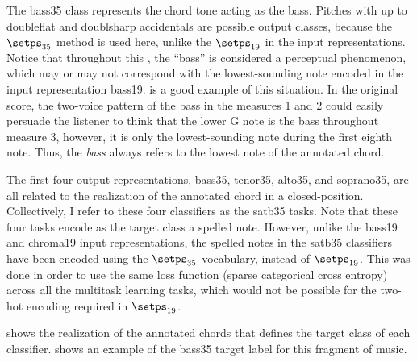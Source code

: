 
The \gls{bass35} class represents the chord tone acting as
the bass. Pitches with up to \gls{doubleflat} and
\gls{doublsharp} accidentals are possible output classes,
because the $\setps_{35}$ method is used here, unlike the
$\setps_{19}$ in the input representations. Notice that
throughout this \thesisdiss{}, the ``bass'' is considered a
perceptual phenomenon, which may or may not correspond with
the lowest-sounding note encoded in the input representation
\gls{bass19}.  is a good example of
this situation. In the original score, the two-voice pattern
of the bass in the measures 1 and 2 could easily persuade
the listener to think that the lower G note is the bass
throughout measure 3, however, it is only the
lowest-sounding note during the first eighth note. Thus, the
\emph{bass} always refers to the lowest note of the
annotated chord.

The first four output representations, \gls{bass35},
\gls{tenor35}, \gls{alto35}, and \gls{soprano35}, are all
related to the realization of the annotated chord in a
\gls{closed-position}. Collectively, I refer to these four
classifiers as the \gls{satb35} tasks. Note that these four
tasks encode as the target class a spelled note. However,
unlike the \gls{bass19} and \gls{chroma19} input
representations, the spelled notes in the \gls{satb35}
classifiers have been encoded using the $\setps_{35}$
vocabulary, instead of $\setps_{19}$. This was done in order
to use the same loss function (sparse categorical cross
entropy) across all the multitask learning tasks, which
would not be possible for the two-hot encoding required in
$\setps_{19}$.

 shows the realization of the annotated
chords that defines the target class of each classifier.
 shows an example of the \gls{bass35}
target label for this fragment of music.




